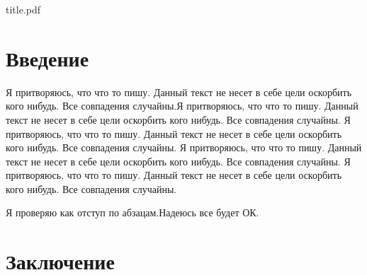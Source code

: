 

\def\oldbibitem{}
\let\oldbibitem=\bibitem
\def\bibitem{\stepcounter{citenum}\oldbibitem}



{title.pdf}

\tableofcontents
\newpage

\section{Введение}
Я притворяюсь, что что то пишу. Данный текст не несет в себе
цели оскорбить кого нибудь. Все совпадения случайны.Я притворяюсь, что что то пишу. Данный текст не несет в себе
цели оскорбить кого нибудь. Все совпадения случайны.
Я притворяюсь, что что то пишу. Данный текст не несет в себе
цели оскорбить кого нибудь. Все совпадения случайны.
Я притворяюсь, что что то пишу. Данный текст не несет в себе
цели оскорбить кого нибудь. Все совпадения случайны.
Я притворяюсь, что что то пишу. Данный текст не несет в себе
цели оскорбить кого нибудь. Все совпадения случайны.

Я проверяю как отступ по абзацам.Надеюсь все будет ОК.


\newpage

\section{Заключение}
\newpage

\begin{thebibliography}{}
\end{thebibliography}




